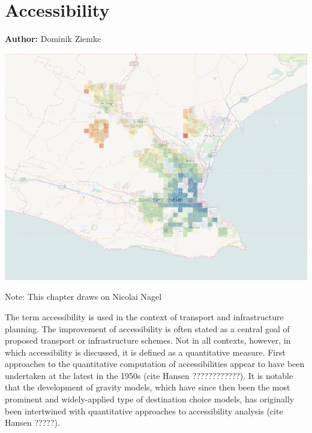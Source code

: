 \chapter{Accessibility}
\label{ch:accessibility}

\hfill \textbf{Author:} Dominik Ziemke

\begin{center} \includegraphics[width=1.\textwidth, angle=0]{extending/figures/accessibility/w_freeSpeed_snapshot.png} \end{center}


Note: This chapter draws on Nicolai Nagel

The term accessibility is used in the context of transport and infrastructure planning. The improvement of accessibility is often stated as a central goal of proposed transport or infrastructure schemes. Not in all contexts, however, in which accessibility is discussed, it is defined as a quantitative measure. First approaches to the quantitative computation of accessibilities appear to have been undertaken at the latest in the 1950s (cite Hansen ????????????). It is notable that the development of gravity models, which have since then been the most prominent and widely-applied type of destination choice models, has originally been intertwined with quantitative approaches to accessibility analysis (cite Hansen ?????).

